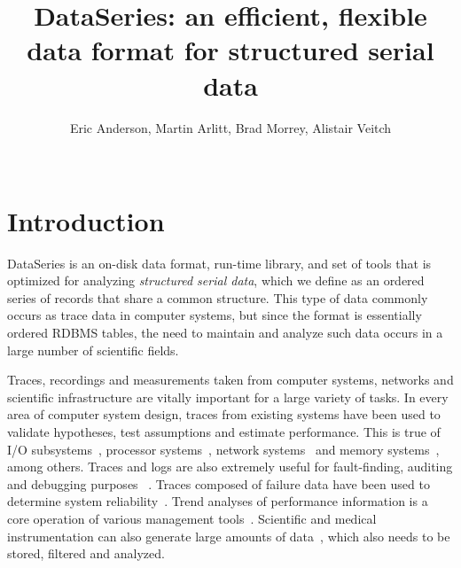 \documentclass{acm_proc_article-sp}
\begin{document}
\newcommand{\DataSeries}{DataSeries}
\newcommand{\DS}{DS}

\title{DataSeries: an efficient, flexible data format for structured serial data}
\author{
\alignauthor
Eric Anderson, Martin Arlitt, Brad Morrey, Alistair Veitch  \\
  \\
}

\maketitle
 

\section{Introduction}\label{sec:intro}

DataSeries is an on-disk data format, run-time library, and set of
tools that is optimized for analyzing \textit{structured serial data},
which we define as an ordered series of records that share a common
structure.  This type of data commonly occurs as trace data in
computer systems, but since the format is essentially ordered RDBMS
tables, the need to maintain and analyze such data occurs in a large
number of scientific fields.

Traces, recordings and measurements taken from computer systems,
networks and scientific infrastructure are vitally important for a
large variety of tasks. In every area of computer system design,
traces from existing systems have been used to validate hypotheses,
test assumptions and estimate performance. This is true of I/O
subsystems~\cite{IORef,Ji03,Uysal03}, processor
systems~\cite{ProcRef}, network systems~\cite{NetRef} and memory
systems~\cite{MemRef}, among others. Traces and logs are also
extremely useful for fault-finding, auditing and debugging purposes
~\cite{DebugRef}. Traces composed of failure data have been used to
determine system reliability~\cite{ReliabilityRef, Schroeder07,
Pinheiro07}. Trend analyses of performance information is a core
operation of various management tools~\cite{MgmtRef}. Scientific and
medical instrumentation can also generate large amounts of
data~\cite{SciRef}, which also needs to be stored, filtered and
analyzed.
\end{document}
